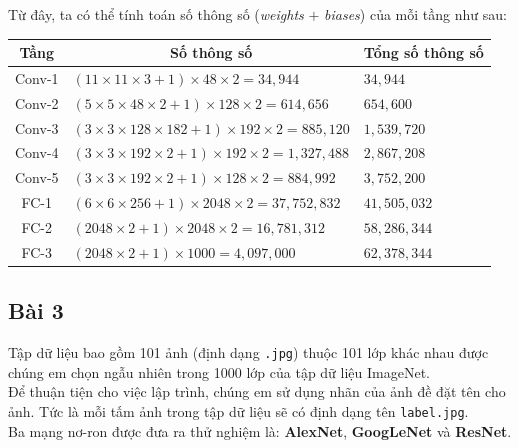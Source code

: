\documentclass[a4paper]{article}
\begin{document}
\noindent
Từ đây, ta có thể tính toán số thông số (\textit{weights} $+$ \textit{biases}) của mỗi tầng như sau:

\begin{table}[!h]
\centering
{\renewcommand{\arraystretch}{1.8}
\begin{tabular}{|c|l|l|}
\hline
\textbf{Tầng} & \multicolumn{1}{c|}{\textbf{Số thông số}} & \multicolumn{1}{c|}{\textbf{Tổng số thông số}}\\ \hline
Conv-1 & $(11 \times 11 \times 3 + 1)\times 48 \times 2 = 34,944$ & $34,944$ \\\hline
Conv-2 & $(5 \times 5 \times 48 \times 2 + 1)\times 128 \times 2 = 614,656$ & $654,600$ \\ \hline
Conv-3 & $(3 \times 3 \times 128 \times 182 + 1)\times 192 \times 2 = 885,120$ & $1,539,720$ \\ \hline
Conv-4 & $(3 \times 3 \times 192 \times 2 + 1)\times 192 \times 2 = 1,327,488$ & $2,867,208$ \\ \hline
Conv-5 & $(3 \times 3 \times 192 \times 2 + 1)\times 128 \times 2 = 884,992$ & $3,752,200$ \\ \hline
FC-1 & $(6 \times 6 \times 256 + 1)\times 2048 \times 2 = 37,752,832$ & $41,505,032$ \\ \hline
FC-2 & $(2048 \times 2 + 1)\times 2048 \times 2 = 16,781,312$ & $58,286,344$ \\ \hline
FC-3 & $(2048 \times 2 + 1)\times 1000 = 4,097,000$ & $62,378,344$ \\ \hline
\end{tabular}} \quad
\end{table}

\subsection{Bài 3}\label{bai3}
Tập dữ liệu bao gồm 101 ảnh (định dạng \texttt{.jpg}) thuộc 101 lớp khác nhau được chúng em chọn ngẫu nhiên trong 1000 lớp của tập dữ liệu ImageNet.\\
Để thuận tiện cho việc lập trình, chúng em sử dụng nhãn của ảnh đề đặt tên cho ảnh. Tức là mỗi tấm ảnh trong tập dữ liệu sẽ có định dạng tên \texttt{label.jpg}.\\
Ba mạng nơ-ron được đưa ra thử nghiệm là: \textbf{AlexNet}, \textbf{GoogLeNet} và \textbf{ResNet}.
\end{document}
